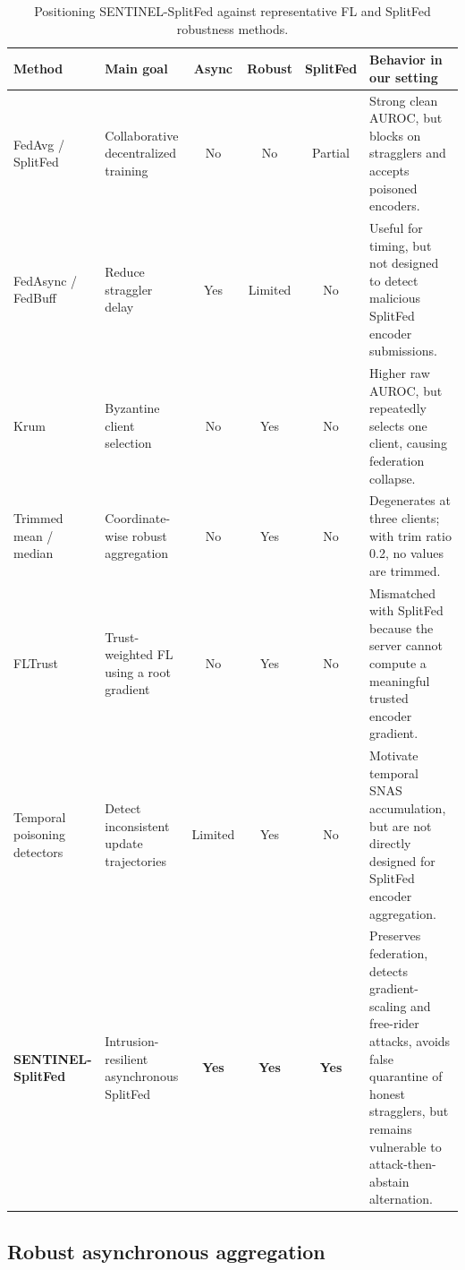 \documentclass[pdflatex,sn-mathphys-num]{sn-jnl}
\begin{document}
\begin{table}[t]
\caption{Positioning SENTINEL-SplitFed against representative FL and SplitFed robustness methods.}
\label{tab:sota-positioning}
\centering
\scriptsize
\setlength{\tabcolsep}{3pt}
\renewcommand{\arraystretch}{1.18}
\begin{tabularx}{\textwidth}{@{}p{2.05cm}p{2.25cm}ccc>{\raggedright\arraybackslash}X@{}}
\toprule
Method & Main goal & Async & Robust & SplitFed & Behavior in our setting \\
\midrule

FedAvg / SplitFed
& Collaborative decentralized training
& No
& No
& Partial
& Strong clean AUROC, but blocks on stragglers and accepts poisoned encoders. \\

FedAsync / FedBuff
& Reduce straggler delay
& Yes
& Limited
& No
& Useful for timing, but not designed to detect malicious SplitFed encoder submissions. \\

Krum
& Byzantine client selection
& No
& Yes
& No
& Higher raw AUROC, but repeatedly selects one client, causing federation collapse. \\

Trimmed mean / median
& Coordinate-wise robust aggregation
& No
& Yes
& No
& Degenerates at three clients; with trim ratio 0.2, no values are trimmed. \\

FLTrust
& Trust-weighted FL using a root gradient
& No
& Yes
& No
& Mismatched with SplitFed because the server cannot compute a meaningful trusted encoder gradient. \\

Temporal poisoning detectors
& Detect inconsistent update trajectories
& Limited
& Yes
& No
& Motivate temporal SNAS accumulation, but are not directly designed for SplitFed encoder aggregation. \\

\textbf{SENTINEL-SplitFed}
& Intrusion-resilient asynchronous SplitFed
& \textbf{Yes}
& \textbf{Yes}
& \textbf{Yes}
& Preserves federation, detects gradient-scaling and free-rider attacks, avoids false quarantine of honest stragglers, but remains vulnerable to attack-then-abstain alternation. \\

\bottomrule
\end{tabularx}
\end{table}
\subsection{Robust asynchronous aggregation}\label{sec:agg}
\end{document}
